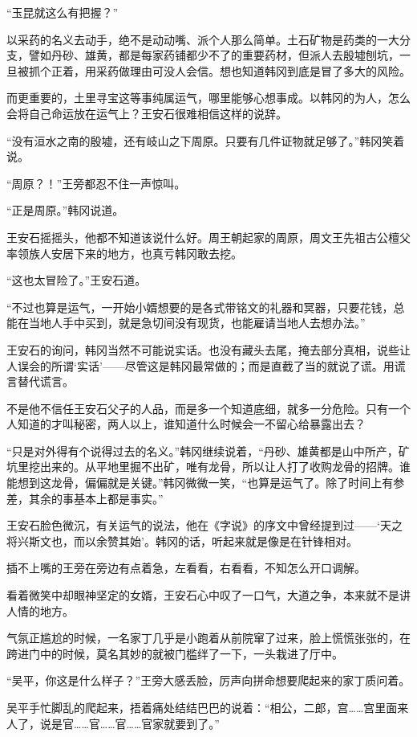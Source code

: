“玉昆就这么有把握？”

以采药的名义去动手，绝不是动动嘴、派个人那么简单。土石矿物是药类的一大分支，譬如丹砂、雄黄，都是每家药铺都少不了的重要药材，但派人去殷墟刨坑，一旦被抓个正着，用采药做理由可没人会信。想也知道韩冈到底是冒了多大的风险。

而更重要的，土里寻宝这等事纯属运气，哪里能够心想事成。以韩冈的为人，怎么会将自己命运放在运气上？王安石很难相信这样的说辞。

“没有洹水之南的殷墟，还有岐山之下周原。只要有几件证物就足够了。”韩冈笑着说。

“周原？！”王旁都忍不住一声惊叫。

“正是周原。”韩冈说道。

王安石摇摇头，他都不知道该说什么好。周王朝起家的周原，周文王先祖古公檀父率领族人安居下来的地方，也真亏韩冈敢去挖。

“这也太冒险了。”王安石道。

“不过也算是运气，一开始小婿想要的是各式带铭文的礼器和冥器，只要花钱，总能在当地人手中买到，就是急切间没有现货，也能雇请当地人去想办法。”

王安石的询问，韩冈当然不可能说实话。也没有藏头去尾，掩去部分真相，说些让人误会的所谓‘实话’——尽管这是韩冈最常做的；而是直截了当的就说了谎。用谎言替代谎言。

不是他不信任王安石父子的人品，而是多一个知道底细，就多一分危险。只有一个人知道的才叫秘密，两人以上，谁知道什么时候会一不留心给暴露出去？

“只是对外得有个说得过去的名义。”韩冈继续说着，“丹砂、雄黄都是山中所产，矿坑里挖出来的。从平地里掘不出矿，唯有龙骨，所以让人打了收购龙骨的招牌。谁能想到这龙骨，偏偏就是关键。”韩冈微微一笑，“也算是运气了。除了时间上有参差，其余的事基本上都是事实。”

王安石脸色微沉，有关运气的说法，他在《字说》的序文中曾经提到过——‘天之将兴斯文也，而以余赞其始’。韩冈的话，听起来就是像是在针锋相对。

插不上嘴的王旁在旁边有点着急，左看看，右看看，不知怎么开口调解。

看着微笑中却眼神坚定的女婿，王安石心中叹了一口气，大道之争，本来就不是讲人情的地方。

气氛正尴尬的时候，一名家丁几乎是小跑着从前院窜了过来，脸上慌慌张张的，在跨进门中的时候，莫名其妙的就被门槛绊了一下，一头栽进了厅中。

“吴平，你这是什么样子？”王旁大感丢脸，厉声向拼命想要爬起来的家丁质问着。

吴平手忙脚乱的爬起来，捂着痛处结结巴巴的说着：“相公，二郎，宫……宫里面来人了，说是官……官……官……官家就要到了。”

